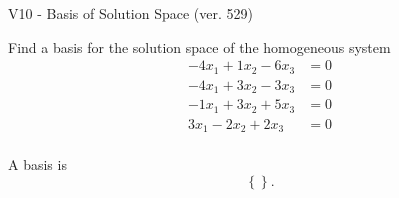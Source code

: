 \begin{exercise}
  \begin{exerciseTitle}V10 - Basis of Solution Space (ver. 529)\end{exerciseTitle}
  \begin{exerciseStatement}
    Find a basis for the solution space of the homogeneous system 
\begin{align*}
 -4 x_ 1 + 1 x_ 2 -6 x_ 3 &= 0  \\ 
  -4 x_ 1 + 3 x_ 2 -3 x_ 3 &= 0  \\ 
  -1 x_ 1 + 3 x_ 2 + 5 x_ 3 &= 0  \\ 
  3 x_ 1 -2 x_ 2 + 2 x_ 3 &= 0  \\ 
 \end{align*}


 
  \end{exerciseStatement}

  \begin{exerciseAnswer}
   A basis is   
\[\left\{\right\}.\]

  


  \end{exerciseAnswer}
\end{exercise}